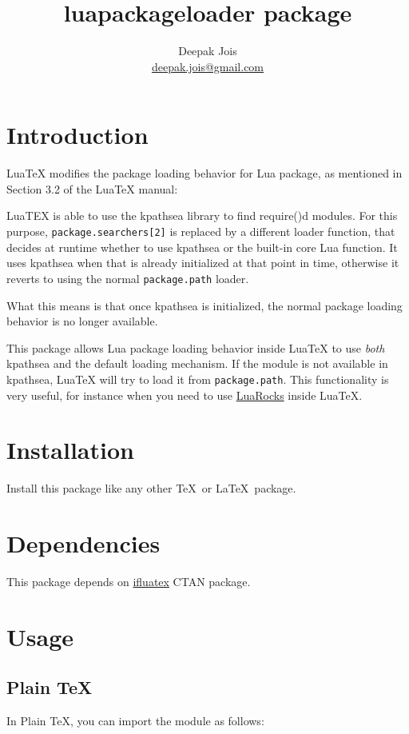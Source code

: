 \documentclass[a4paper]{article}
\title{\textsf{luapackageloader} package}
\author{Deepak Jois \\ \href{deepak.jois@gmail.com}{deepak.jois@gmail.com}}
\begin{document}
\maketitle

\section*{Introduction}
LuaTeX modifies the package loading behavior for Lua package, as mentioned in
Section 3.2 of the LuaTeX manual:

\begin{displayquote}
LuaTEX is able to use the kpathsea library to find require()d modules. For this
purpose, \texttt{package.searchers[2]} is replaced by a different loader function,
that decides at runtime whether to use kpathsea or the built-in core Lua
function. It uses kpathsea when that is already initialized at that point in
  time, otherwise it reverts to using the normal \texttt{package.path} loader.
\end{displayquote}

What this means is that once kpathsea is initialized, the normal package
loading behavior is no longer available.

This package allows Lua package loading behavior inside LuaTeX to use \textit{both}
kpathsea and the default loading mechanism. If the module is not available in kpathsea,
LuaTeX will try to load it from \texttt{package.path}. This functionality is very useful,
for instance when you need to use \href{https://luarocks.org/}{LuaRocks} inside LuaTeX.

\section{Installation}

Install this package like any other \TeX~or \LaTeX~package.

\section{Dependencies}

This package depends on \href{https://www.ctan.org/pkg/ifluatex}{ifluatex} CTAN package.

\section{Usage}

\subsection{Plain \TeX}
In Plain \TeX, you can import the module as follows:
\end{document}
